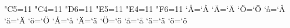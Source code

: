 %
%
%
%
%
\begingroup
\catcode"C5=11 %
\catcode"C4=11 %
\catcode"D6=11 %
\catcode"E5=11 %
\catcode"E4=11 %
\catcode"F6=11 %
\uccode`^^c5=`^^c5 %
\uccode`^^c4=`^^c4 %
\uccode`^^d6=`^^d6 %
\uccode`^^e5=`^^c5 %
\uccode`^^e4=`^^c4 %
\uccode`^^f6=`^^d6 %
\lccode`^^c5=`^^e5 \lccode`^^c4=`^^e4 \lccode`^^d6=`^^f6
\lccode`^^e5=`^^e5 \lccode`^^e4=`^^e4 \lccode`^^f6=`^^f6
